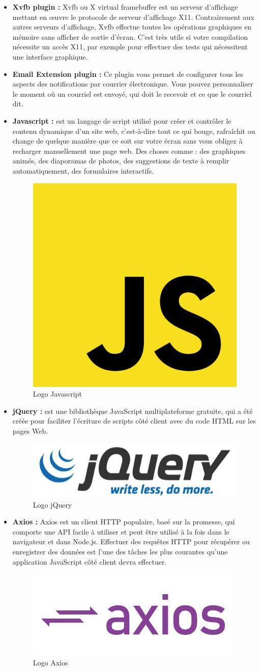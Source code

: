 \begin{itemize}
	\item \textbf{Xvfb plugin :} Xvfb ou X virtual framebuffer est un serveur d'affichage mettant en œuvre le protocole de serveur d'affichage X11. Contrairement aux autres serveurs d'affichage, Xvfb effectue toutes les opérations graphiques en mémoire sans afficher de sortie d'écran. C'est très utile si votre compilation nécessite un accès X11, par exemple pour effectuer des tests qui nécessitent une interface graphique.
	\item \textbf{Email Extension plugin : }Ce plugin vous permet de configurer tous les aspects des notifications par courrier électronique. Vous pouvez personnaliser le moment où un courriel est envoyé, qui doit le recevoir et ce que le courriel dit.
	\item \textbf{Javascript  : }est un langage de script utilisé pour créer et contrôler le contenu dynamique d'un site web, c'est-à-dire tout ce qui bouge, rafraîchit ou change de quelque manière que ce soit sur votre écran sans vous obligez à recharger manuellement une page web. Des choses comme : des graphiques animés, des diaporamas de photos, des suggestions de texte à remplir automatiquement, des formulaires interactifs.
	\begin{figure}[H]
		\centering
		\includegraphics[width=0.13\linewidth]{img/logos/js}
		\caption[Logo Javascript]{Logo Javascript}
		\label{fig:js}
	\end{figure}
	
	\item \textbf{jQuery :}  est une bibliothèque JavaScript multiplateforme gratuite, qui a été créée pour faciliter l'écriture de scripts côté client avec du code HTML sur les pages Web.
	\begin{figure}[H]
		\centering
		\includegraphics[width=0.3\linewidth]{img/logos/jquery}
		\caption[Logo jQuery]{Logo jQuery}
		\label{fig:jquery}
	\end{figure}
	
	\item \textbf{Axios :} Axios est un client HTTP populaire, basé sur la promesse, qui comporte une API facile à utiliser et peut être utilisé à la fois dans le navigateur et dans Node.js. Effectuer des requêtes HTTP pour récupérer ou enregistrer des données est l'une des tâches les plus courantes qu'une application JavaScript côté client devra effectuer.
	\begin{figure}[H]
		\centering
		\includegraphics[width=0.3\linewidth]{img/logos/axios}
		\caption[Logo Axios]{Logo Axios}
		\label{fig:axios}
	\end{figure}
	

\end{itemize}
